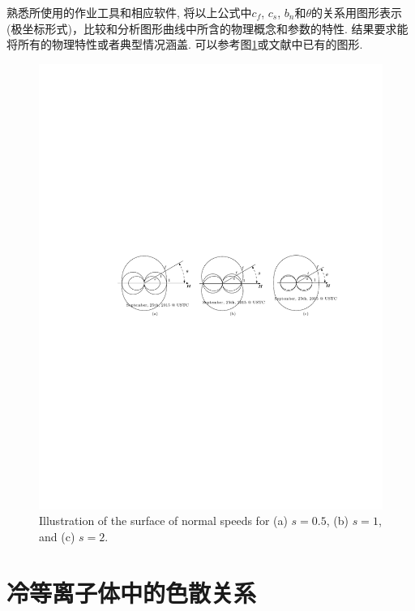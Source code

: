 \documentclass{article}
\begin{document}
	熟悉所使用的作业工具和相应软件, 将以上公式中$c_f$, $c_s$,
	$b_n$和$\theta$的关系用图形表示(极坐标形式)，比较和分析图形曲线中所含的物理概念和参数的特性.
	结果要求能将所有的物理特性或者典型情况涵盖. 可以参考图\ref{Friedrich}或文献\citet{Jeffrey1964}中已有的图形.
	\begin{figure}
		\begin{center}
			\includegraphics[width=.9\textwidth]{Friedrich.pdf}
			\caption{Illustration of the surface of normal speeds for (a) $s = 0.5$, (b) $s=1$, and
				(c) $s=2$.}\label{Friedrich}
		\end{center}
	\end{figure}
	
	\section{冷等离子体中的色散关系}
	
\end{document}
